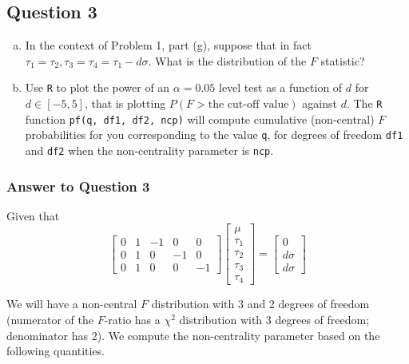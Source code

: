 \documentclass[paper=a4, fontsize=11pt]{scrartcl} %
\begin{document}
\subsection*{Question 3} 
\begin{enumerate}[(a)]
\item In the context of Problem 1, part (g), suppose that in fact $\tau_1 = \tau_2, \tau_3 = \tau_4 = \tau_1 - d\sigma$. What is the distribution of the $F$ statistic?\\
 
\item Use \texttt{R} to plot the power of an $\alpha = 0.05$ level test as a function of $d$ for $d \in [-5, 5]$, that is plotting $P(F > \text{the cut-off value})$ against $d$.  The \texttt{R} function \texttt{pf(q, df1, df2, ncp)} will compute cumulative (non-central) $F$ probabilities for you corresponding to the value \texttt{q}, for degrees of
freedom \texttt{df1} and \texttt{df2} when the non-centrality parameter is \texttt{ncp}.
\end{enumerate}

\bigskip
\subsubsection*{Answer to Question 3}
Given that
$$
\begin{bmatrix} 0 & 1 & -1 & 0 & 0 \\
                             0 & 1 & 0 & -1 & 0 \\
                             0 & 1 & 0 & 0 & -1
\end{bmatrix}
\begin{bmatrix} \mu\\
                             \tau_1\\
                             \tau_2\\
                             \tau_3\\
                             \tau_4
\end{bmatrix}
=
\begin{bmatrix} 0\\
                              d\sigma\\
                             d \sigma
\end{bmatrix}
$$

We will have a non-central $F$ distribution with 3 and 2 degrees of freedom (numerator of the $F$-ratio has a $\chi^2$ distribution with 3 degrees of freedom; denominator has 2). We compute the non-centrality parameter based on the following quantities.  
\end{document}
